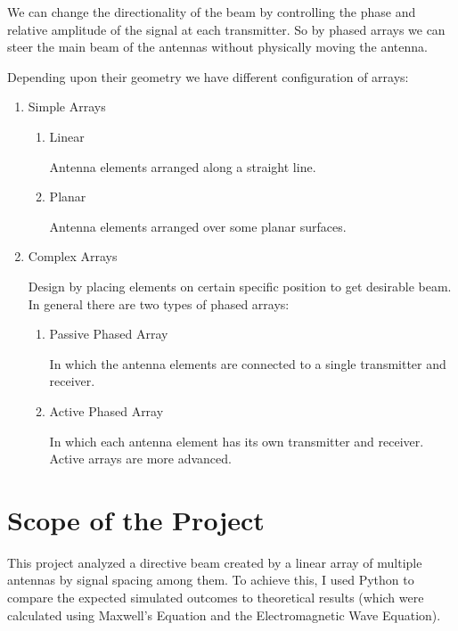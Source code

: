 We can change the directionality of the beam by controlling the phase and relative amplitude of the signal at each transmitter. So by phased arrays we can steer the main beam of the antennas without physically moving the antenna.

Depending upon their geometry we have different configuration of arrays:

\begin{enumerate}

   \item Simple Arrays
      \begin{enumerate}

         \item Linear

            Antenna elements arranged along a straight line.

         \item Planar

            Antenna elements arranged over some planar surfaces.

      \end{enumerate}

   \item Complex Arrays

      Design by placing elements on certain specific position to get desirable beam. In general there are two types of phased arrays:

      \begin{enumerate}

         \item Passive Phased Array

            In which the antenna elements are connected to a single transmitter and receiver.

         \item Active Phased Array

            In which each antenna element has its own transmitter and receiver. Active arrays are more advanced.

      \end{enumerate}

\end{enumerate}

\section{Scope of the Project}

This project analyzed a directive beam created by a linear array of multiple antennas by signal spacing among them. 
To achieve this, I used Python to compare the expected simulated outcomes to theoretical results (which were calculated using Maxwell's Equation and the Electromagnetic Wave Equation).
